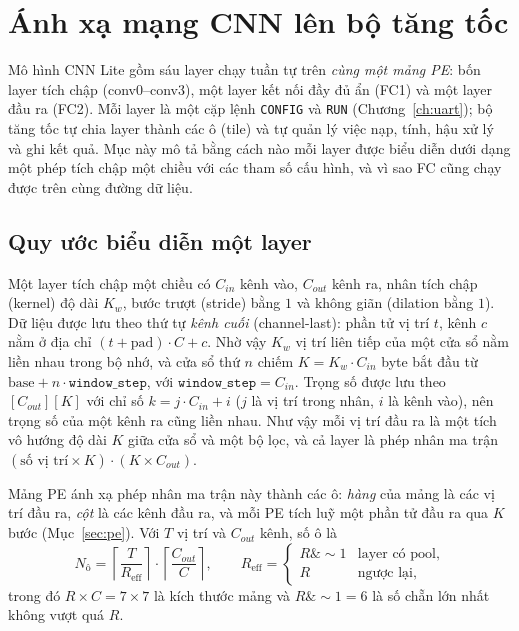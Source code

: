\section{Ánh xạ mạng CNN lên bộ tăng tốc}\label{sec:anhxa}
Mô hình CNN Lite gồm sáu layer chạy tuần tự trên \emph{cùng một mảng PE}: bốn layer tích chập (conv0--conv3), một layer kết nối đầy đủ ẩn (FC1) và một layer đầu ra (FC2).
Mỗi layer là một cặp lệnh \texttt{CONFIG} và \texttt{RUN} (Chương~\ref{ch:uart}); bộ tăng tốc tự chia layer thành các ô (tile) và tự quản lý việc nạp, tính, hậu xử lý và ghi kết quả.
Mục này mô tả bằng cách nào mỗi layer được biểu diễn dưới dạng một phép tích chập một chiều với các tham số cấu hình, và vì sao FC cũng chạy được trên cùng đường dữ liệu.

\subsection{Quy ước biểu diễn một layer}
Một layer tích chập một chiều có $C_{in}$ kênh vào, $C_{out}$ kênh ra, nhân tích chập (kernel) độ dài $K_w$, bước trượt (stride) bằng $1$ và không giãn (dilation bằng $1$).
Dữ liệu được lưu theo thứ tự \emph{kênh cuối} (channel-last): phần tử vị trí $t$, kênh $c$ nằm ở địa chỉ $(t+\mathrm{pad})\cdot C+c$.
Nhờ vậy $K_w$ vị trí liên tiếp của một cửa sổ nằm liền nhau trong bộ nhớ, và cửa sổ thứ $n$ chiếm $K=K_w\cdot C_{in}$ byte bắt đầu từ $\mathrm{base}+n\cdot\texttt{window\_step}$, với $\texttt{window\_step}=C_{in}$.
Trọng số được lưu theo $[C_{out}][K]$ với chỉ số $k=j\cdot C_{in}+i$ ($j$ là vị trí trong nhân, $i$ là kênh vào), nên trọng số của một kênh ra cũng liền nhau.
Như vậy mỗi vị trí đầu ra là một tích vô hướng độ dài $K$ giữa cửa sổ và một bộ lọc, và cả layer là phép nhân ma trận $(\text{số vị trí}\times K)\cdot(K\times C_{out})$.

Mảng PE ánh xạ phép nhân ma trận này thành các ô: \emph{hàng} của mảng là các vị trí đầu ra, \emph{cột} là các kênh đầu ra, và mỗi PE tích luỹ một phần tử đầu ra qua $K$ bước (Mục~\ref{sec:pe}).
Với $T$ vị trí và $C_{out}$ kênh, số ô là
\begin{equation}\label{eq:soo}
  N_{\text{ô}}=\left\lceil \frac{T}{R_{\text{eff}}}\right\rceil\cdot\left\lceil \frac{C_{out}}{C}\right\rceil,\qquad
  R_{\text{eff}}=\begin{cases}R\mathbin{\&}{\sim}1 & \text{layer có pool,}\\ R & \text{ngược lại,}\end{cases}
\end{equation}
trong đó $R\times C=7\times7$ là kích thước mảng và $R\mathbin{\&}{\sim}1=6$ là số chẵn lớn nhất không vượt quá $R$.

